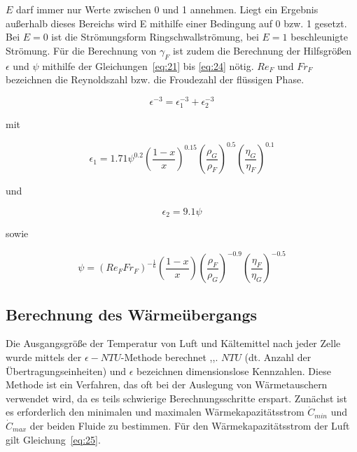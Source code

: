 $E$ darf immer nur Werte zwischen 0 und 1 annehmen. Liegt ein Ergebnis außerhalb dieses Bereichs wird E mithilfe einer Bedingung auf 0 bzw. 1 gesetzt. Bei $E=0$ ist die Strömungsform Ringschwallströmung, bei $E=1$ beschleunigte Strömung.
Für die Berechnung von $\gamma_F$ ist zudem die Berechnung der Hilfsgrößen $\epsilon$ und $\psi$ mithilfe der Gleichungen~\ref{eq:21} bis \ref{eq:24} nötig. $Re_F$ und $Fr_F$ bezeichnen die Reynoldszahl bzw. die Froudezahl der flüssigen Phase.

\begin{equation}
\label{eq:21}
\epsilon^{-3} = \epsilon_1^{-3} + \epsilon_2^{-3}
\end{equation}

mit

\begin{equation}
\label{eq:22}
\epsilon_1 = 1.71 \psi^{0.2} \left( \frac{1-x}{x} \right)^{0.15} \left( \frac{\rho_G}{\rho_F} \right)^{0.5} \left( \frac{\eta_G}{\eta_F} \right)^{0.1}
\end{equation}

und

\begin{equation}
\label{eq:23}
\epsilon_2 = 9.1 \psi
\end{equation}

\clearpage

sowie

\begin{equation}
\label{eq:24}
\psi = (Re_F Fr_F)^{-\frac{1}{6}} \left( \frac{1-x}{x} \right) \left(\frac{\rho_F}{\rho_G} \right)^{-0.9} \left(\frac{\eta_F}{\eta_G} \right)^{-0.5}
\end{equation}

\subsection{Berechnung des Wärmeübergangs}
\label{subsec:Berechnung des Wärmeübergangs}

Die Ausgangsgröße der Temperatur von Luft und Kältemittel nach jeder Zelle wurde mittels der $\epsilon-NTU$-Methode berechnet \cite{SpringerVerlagGmbH.2013},\cite{Bergman.2011},\cite{Nellis.2009}. $NTU$ (dt. Anzahl der Übertragungseinheiten) und $\epsilon$ bezeichnen dimensionslose Kennzahlen. Diese Methode ist ein Verfahren, das oft bei der Auslegung von Wärmetauschern verwendet wird, da es teils schwierige Berechnungsschritte erspart. Zunächst ist es erforderlich den minimalen und maximalen Wärmekapazitätsstrom $\dot{C}_{min}$ und $\dot{C}_{max}$ der beiden Fluide zu bestimmen.
Für den Wärmekapazitätsstrom der Luft gilt Gleichung~\ref{eq:25}.

